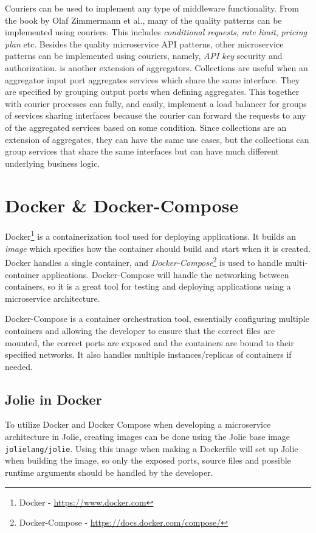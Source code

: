Couriers can be used to implement any type of middleware functionality. From the book by Olaf Zimmermann et al., many of the quality patterns can be implemented using couriers. This includes
\textit{conditional requests}, \textit{rate limit}, \textit{pricing plan} etc. Besides the quality microservice API patterns, other microservice patterns can be implemented using couriers, namely, \textit{API key} security and authorization.
 is another extension of aggregators. Collections are useful when an aggregator input port aggregates services which share the same interface.
They are specified by grouping output ports when defining aggregates.
This together with courier processes can fully, and easily, implement a load balancer for groups of services sharing interfaces because the courier can forward the requests to any of the aggregated services based on some condition.
Since collections are an extension of aggregates, they can have the same use cases, but the collections can group services that share the same interfaces but can have much different underlying business logic.

\section{Docker \& Docker-Compose}
Docker\footnote{Docker - \url{https://www.docker.com}} is a containerization tool used for deploying applications. It builds an \textit{image} which specifies how the container should build and start when it is created.
Docker handles a single container, and \textit{Docker-Compose}\footnote{Docker-Compose - \url{https://docs.docker.com/compose/}} is used to handle multi-container applications. Docker-Compose will handle the networking between containers, so it is a great tool for testing and deploying applications using a microservice architecture.

Docker-Compose is a container orchestration tool, essentially configuring multiple containers and allowing the developer to ensure that the correct files are mounted, the correct ports are exposed and the containers are bound to their specified networks. It also handles multiple instances/replicas
of containers if needed.

\subsection{Jolie in Docker}
\label{label:jolie_in_docker}
To utilize Docker and Docker Compose when developing a microservice architecture in Jolie, creating images can be done using the Jolie base image \texttt{jolielang/jolie}.
Using this image when making a Dockerfile will set up Jolie when building the image, so only the exposed ports, source files and possible runtime arguments should be handled by the developer.

